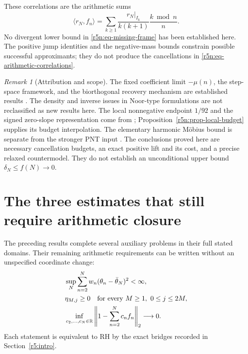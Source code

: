 \documentclass[11pt,a4paper]{article}
\theoremstyle{definition}\newtheorem{definition}[theorem]{Definition}
\theoremstyle{remark}\newtheorem{remark}[theorem]{Remark}
\newcommand{\R}{\mathbb R}\newcommand{\Z}{\mathbb Z}
\numberwithin{equation}{section}
\begin{document}
These correlations are the arithmetic sums
\begin{equation}
\label{r5n:eq-arithmetic-correlations}
 \langle r_N,f_n\rangle
 =\sum_{k\ge1}\frac{r_N|_{I_k}}{k(k+1)}
                        \frac{k\bmod n}{n}.
\end{equation}
No divergent lower bound in \eqref{r5n:eq-missing-frame} has
been established here. The positive jump identities and the
negative-mass bounds constrain possible successful approximants;
they do not produce the cancellations in
\eqref{r5n:eq-arithmetic-correlations}.

\begin{remark}[Attribution and scope]
\label{r5n:rem-scope}
The fixed coefficient limit \(-\mu(n)\), the step-space framework,
and the biorthogonal recovery mechanism are established results
\cite{Balazard,GallardoSeco2025}. The density and inverse issues
in Noor-type formulations are not reclassified as new results
here. The local nonnegative endpoint \(1/92\) and the signed
zero-slope representation come from \cite{TransferZeta};
Proposition~\ref{r5n:prop-local-budget} supplies its budget
interpolation. The elementary harmonic M\"obius bound is
separate from the stronger PNT input \cite{TaoMobius}.
The conclusions proved here are necessary cancellation budgets,
an exact positive lift and its cost, and a precise relaxed
countermodel. They do not establish an unconditional upper
bound \(\delta_N\le f(N)\to0\).
\end{remark}

\section{The three estimates that still require arithmetic closure}
\label{r5:targets}

The preceding results complete several auxiliary problems in their
full stated domains. Their remaining arithmetic requirements can
be written without an unspecified coordinate change:
\begin{align}
 &\sup_N\sum_{n=2}^Nw_n(\theta_n-\bar\theta_N)^2<\infty,
        \label{r5:target-prime}\\
 &\eta_{M,j}\ge0\quad\hbox{for every }M\ge1,\ 0\le j\le2M,
        \label{r5:target-li}\\
 &\inf_{c_2,\ldots,c_N\in\R}
      \left\|1-\sum_{n=2}^Nc_nf_n\right\|_2\longrightarrow0.
        \label{r5:target-nyman}
\end{align}
Each statement is equivalent to RH by the exact bridges recorded
in Section~\ref{r5:intro}.
\end{document}
